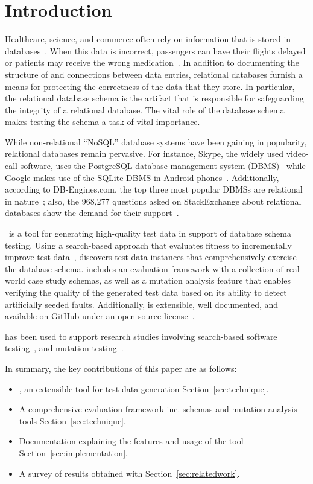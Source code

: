 \section{Introduction}\label{sec:intro}

Healthcare, science, and commerce often rely on information that is stored in
databases~\cite{kapfhammer2007comprehensive}.  When this data is incorrect, passengers can have their flights delayed or
patients may receive the wrong medication~\cite{databasebook}.  In addition to documenting the structure of and
connections between data entries, relational databases furnish a means for protecting the correctness of the data that
they store.  In particular, the relational database schema is the artifact that is responsible for safeguarding the
integrity of a relational database. The vital role of the database schema makes testing the schema a task of vital
importance.

While non-relational ``NoSQL'' database systems have been gaining in popularity, relational databases remain pervasive.
For instance, Skype, the widely used video-call software, uses the PostgreSQL database management system
(DBMS)~\cite{postgres} while Google makes use of the SQLite DBMS in Android phones~\cite{sqlite}.  Additionally,
according to DB-Engines.com, the top three most popular DBMSs are relational in nature~\cite{dbrank}; also, the 968,277
questions asked on StackExchange about relational databases show the demand for their support~\cite{stackexchange}.

\sa~is a tool for generating high-quality test data in support of database schema testing. Using a search-based approach
that evaluates fitness to incrementally improve test data~\cite{Korel:AVM}, {\sa} discovers test data instances that
comprehensively exercise the database schema.  {\sa} includes an evaluation framework with a collection of real-world
case study schemas, as well as a mutation analysis feature that enables verifying the quality of the generated test data
based on its ability to detect artificially seeded faults.  Additionally, {\sa} is extensible, well documented, and
available on GitHub under an open-source license~\cite{tool}.

{\sa} has been used to support research studies involving search-based software
testing~\cite{kapfhammer2013search,mcminn2015effectiveness,kinneer2015automatically}, and mutation
testing~\cite{wright2013efficient,wright2014impact,wright2015mutation,mcminn2016virtual}.

In summary, the key contributions of this paper are as follows:

\begin{itemize}
\item {\sa}, an extensible tool for test data generation Section~\ref{sec:technique}.
\item A comprehensive evaluation framework inc. schemas and mutation analysis tools Section~\ref{sec:technique}.
\item Documentation explaining the features and usage of the tool Section~\ref{sec:implementation}.
\item A survey of results obtained with {\sa} Section~\ref{sec:relatedwork}.
\end{itemize}
